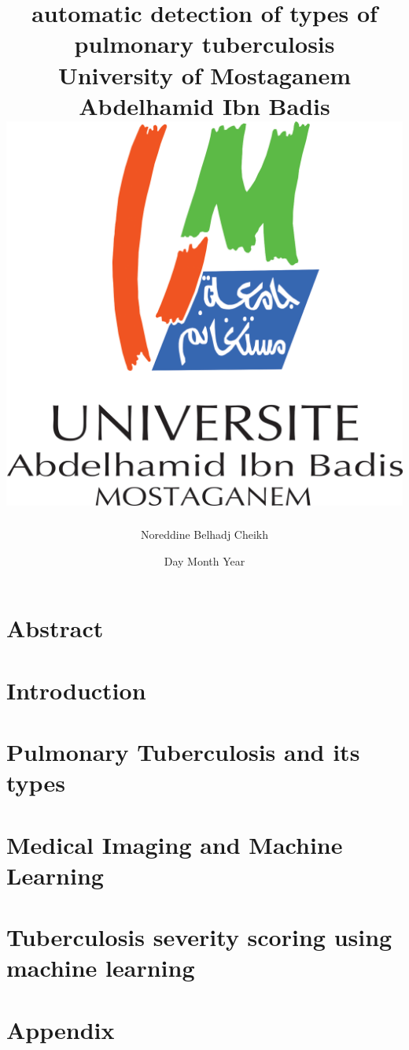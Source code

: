 \documentclass[12pt]{report}
\title{ 
{automatic detection of types of pulmonary tuberculosis}\\
{\large University of Mostaganem Abdelhamid Ibn Badis}\\
{\includegraphics{university.png}}
}
\author{Noreddine Belhadj Cheikh}
\date{Day Month Year}
\begin{document}
 \maketitle
\chapter*{Abstract}


\tableofcontents
\chapter*{Introduction}

\chapter{Pulmonary Tuberculosis and its types}

\chapter{Medical Imaging and Machine Learning}

\chapter{Tuberculosis severity scoring using machine learning}


\newpage
\appendix
\chapter{Appendix}

\printacronyms[include-classes=abbrev,name=Abbreviations]
\newpage
 

\end{document}
